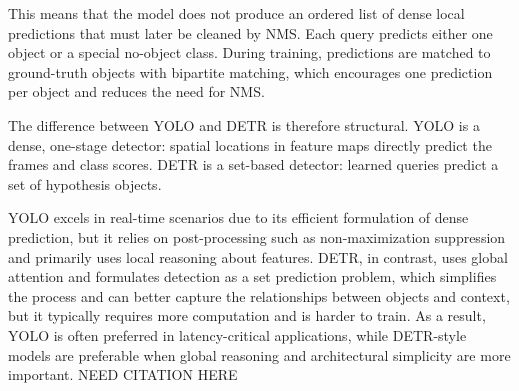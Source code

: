 This means that the model does not produce an ordered list of dense local predictions that must later be cleaned by NMS.
Each query predicts either one object or a special no-object class. During training, predictions are matched to ground-truth objects with bipartite matching, which encourages one prediction per object and reduces the need for NMS.


The difference between YOLO and DETR is therefore structural. YOLO is a dense, one-stage detector: spatial locations in feature maps directly predict the frames and class scores. DETR is a set-based detector: learned queries predict a set of hypothesis objects.

YOLO excels in real-time scenarios due to its efficient formulation of dense prediction, but it relies on post-processing such as non-maximization suppression and primarily uses local reasoning about features. DETR, in contrast, uses global attention and formulates detection as a set prediction problem, which simplifies the process and can better capture the relationships between objects and context, but it typically requires more computation and is harder to train. As a result, YOLO is often preferred in latency-critical applications, while DETR-style models are preferable when global reasoning and architectural simplicity are more important. NEED CITATION HERE




